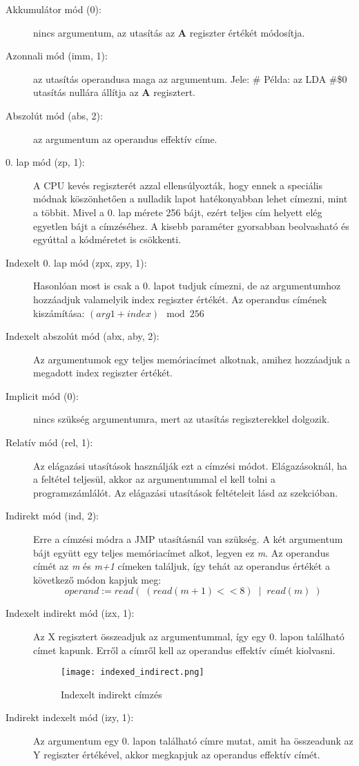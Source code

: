 \begin{description}
	\item[Akkumulátor mód (0):] nincs argumentum, az utasítás az \textbf{A} regiszter értékét módosítja.
	\item[Azonnali mód (imm, 1):] az utasítás operandusa maga az argumentum. Jele: \#
	\newline
	Példa: az LDA \#\$0 utasítás nullára állítja az \textbf{A} regisztert.
	\item[Abszolút mód (abs, 2):] az argumentum az operandus effektív címe.
	\item[0. lap mód (zp, 1):] A CPU kevés regiszterét azzal ellensúlyozták, hogy ennek a speciális módnak köszönhetően a nulladik lapot hatékonyabban lehet címezni, mint a többit. 
	Mivel a 0. lap mérete 256 bájt, ezért teljes cím helyett elég egyetlen bájt a címzéséhez.
	A kisebb paraméter gyorsabban beolvasható és egyúttal a kódméretet is csökkenti.
	\item[Indexelt 0. lap mód (zpx, zpy, 1):]
	Hasonlóan most is csak a 0. lapot tudjuk címezni, de az argumentumhoz hozzáadjuk valamelyik index regiszter értékét.
	Az operandus címének kiszámítása: $ (arg1 + index) \mod 256 $
	\item[Indexelt abszolút mód (abx, aby, 2):] Az argumentumok egy teljes memóriacímet alkotnak, amihez hozzáadjuk a megadott index regiszter értékét. 
	\item[Implicit mód (0):] nincs szükség argumentumra, mert az utasítás regiszterekkel dolgozik.
	\item[Relatív mód (rel, 1):] Az elágazási utasítások használják ezt a címzési módot. Elágazásoknál, ha a feltétel teljesül, akkor az argumentummal el kell tolni a programszámlálót. Az elágazási utasítások feltételeit lásd az \emph{} szekcióban.
	\item[Indirekt mód (ind, 2):] 
	Erre a címzési módra a JMP utasításnál van szükség.
	A két argumentum bájt együtt egy teljes memóriacímet alkot, legyen ez \emph{m}.
	Az operandus címét az \emph{m} és \emph{m+1} címeken találjuk, így tehát az operandus értékét a következő módon kapjuk meg: $$ operand := read(\;(read(m+1) << 8) \;\; | \;\; read(m)\;) $$
	\item[Indexelt indirekt mód (izx, 1):]
	Az X regisztert összeadjuk az argumentummal, így egy 0. lapon található címet kapunk.
	Erről a címről kell az operandus effektív címét kiolvasni.
	\begin{figure}[H]
		\centering
		\vspace{0.4cm}
		\texttt{[image: indexed\_indirect.png]}
		\caption{Indexelt indirekt címzés}
	\end{figure}
	\item[Indirekt indexelt mód (izy, 1):]
	Az argumentum egy 0. lapon található címre mutat, amit ha összeadunk az Y regiszter értékével, akkor megkapjuk az operandus effektív címét. 
	
	
	
\end{description}

